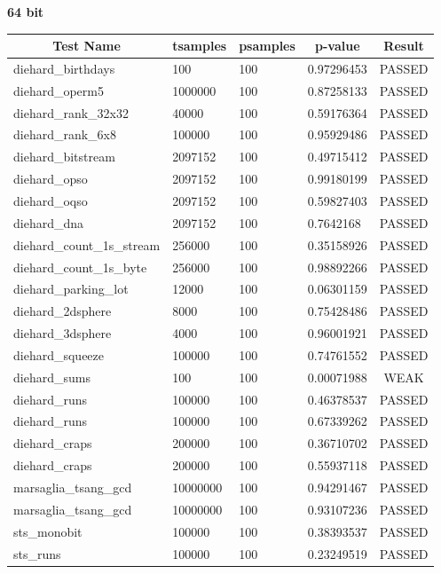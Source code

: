 \documentclass[titlepage, 11pt]{article}
\begin{document}
\newpage
\noindent \textbf{64 bit}
\begin{table}[!htb]
\begin{tabular}{l|l|l|l|c}
\hline
\multicolumn{1}{c|}{\textbf{Test Name}} & \multicolumn{1}{c|}{\textbf{tsamples}} & \multicolumn{1}{c|}{\textbf{psamples}} & \multicolumn{1}{c|}{\textbf{p-value}} & \textbf{Result} \\ \hline
diehard\_birthdays & 100 & 100 & 0.97296453 & PASSED \\
diehard\_operm5 & 1000000 & 100 & 0.87258133 & PASSED \\
diehard\_rank\_32x32 & 40000 & 100 & 0.59176364 & PASSED \\
diehard\_rank\_6x8 & 100000 & 100 & 0.95929486 & PASSED \\
diehard\_bitstream & 2097152 & 100 & 0.49715412 & PASSED \\
diehard\_opso & 2097152 & 100 & 0.99180199 & PASSED \\
diehard\_oqso & 2097152 & 100 & 0.59827403 & PASSED \\
diehard\_dna & 2097152 & 100 & 0.7642168 & PASSED \\
diehard\_count\_1s\_stream & 256000 & 100 & 0.35158926 & PASSED \\
diehard\_count\_1s\_byte & 256000 & 100 & 0.98892266 & PASSED \\
diehard\_parking\_lot & 12000 & 100 & 0.06301159 & PASSED \\
diehard\_2dsphere & 8000 & 100 & 0.75428486 & PASSED \\
diehard\_3dsphere & 4000 & 100 & 0.96001921 & PASSED \\
diehard\_squeeze & 100000 & 100 & 0.74761552 & PASSED \\
diehard\_sums & 100 & 100 & 0.00071988 & WEAK \\
diehard\_runs & 100000 & 100 & 0.46378537 & PASSED \\
diehard\_runs & 100000 & 100 & 0.67339262 & PASSED \\
diehard\_craps & 200000 & 100 & 0.36710702 & PASSED \\
diehard\_craps & 200000 & 100 & 0.55937118 & PASSED \\
marsaglia\_tsang\_gcd & 10000000 & 100 & 0.94291467 & PASSED \\
marsaglia\_tsang\_gcd & 10000000 & 100 & 0.93107236 & PASSED \\
sts\_monobit & 100000 & 100 & 0.38393537 & PASSED \\
sts\_runs & 100000 & 100 & 0.23249519 & PASSED \\

\end{tabular}
\end{table}
\end{document}
